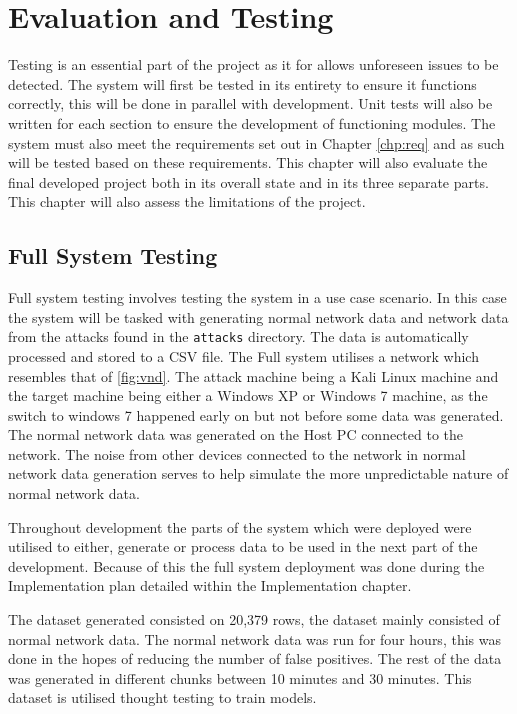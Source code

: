 \chapter{Evaluation and Testing}\label{chp:tes}
Testing is an essential part of the project as it for allows unforeseen issues to be detected. The system will first be tested in its entirety to ensure it functions correctly, this will be done in parallel with development. Unit tests will also be written for each section to ensure the development of functioning modules. The system must also meet the requirements set out in Chapter \ref{chp:req} and as such will be tested based on these requirements. This chapter will also evaluate the final developed project both in its overall state and in its three separate parts. This chapter will also assess the limitations of the project.

\section{Full System Testing}
Full system testing involves testing the system in a use case scenario. In this case the system will be tasked with generating normal network data and network data from the attacks found in the \texttt{attacks} directory. The data is automatically processed and stored to a CSV file. 
The Full system utilises a network which resembles that of \ref{fig:vnd}. The attack machine being a Kali Linux machine and the target machine being either a Windows XP or Windows 7 machine, as the switch to windows 7 happened early on but not before some data was generated. The normal network data was generated on the Host PC connected to the network. The noise from other devices connected to the network in normal network data generation serves to help simulate the more unpredictable nature of normal network data.

Throughout development the parts of the system which were deployed were utilised to either, generate or process data to be used in the next part of the development. Because of this the full system deployment was done during the Implementation plan detailed within the Implementation chapter.

The dataset generated consisted on 20,379 rows, the dataset mainly consisted of normal network data. The normal network data was run for four hours, this was done in the hopes of reducing the number of false positives. The rest of the data was generated in different chunks between 10 minutes and 30 minutes. This dataset is utilised thought testing to train models.

